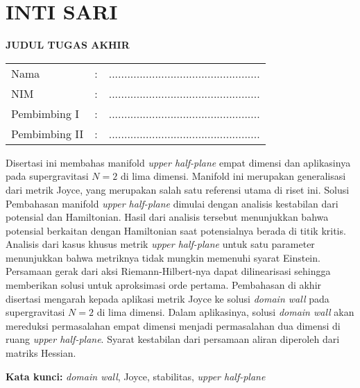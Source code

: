 \chapter*{INTI SARI}
\fontsize{14pt}{1.5em}\selectfont
\begin{center}
	\uppercase{\textbf{judul tugas akhir}}\\
\end{center}
\begin{tabular}{lcl}
	Nama & : & .................................................\\
	NIM & : & .................................................\\
	Pembimbing I &	: & .................................................\\
	Pembimbing II &	: & .................................................\\
\end{tabular}

\singlespacing
\noindent Disertasi ini membahas manifold \emph{upper half-plane} empat dimensi dan aplikasinya pada supergravitasi $N=2$ di lima dimensi. Manifold ini merupakan generalisasi dari metrik Joyce, yang merupakan salah satu referensi utama di riset ini. Solusi Pembahasan manifold \emph{upper half-plane} dimulai dengan analisis kestabilan dari potensial dan Hamiltonian. Hasil dari analisis tersebut menunjukkan bahwa potensial berkaitan dengan Hamiltonian saat potensialnya berada di titik kritis. Analisis dari kasus khusus metrik \emph{upper half-plane} untuk satu parameter menunjukkan bahwa metriknya tidak mungkin memenuhi syarat Einstein. Persamaan gerak dari aksi Riemann-Hilbert-nya dapat dilinearisasi sehingga memberikan solusi untuk aproksimasi orde pertama. Pembahasan di akhir disertasi mengarah kepada aplikasi metrik Joyce ke solusi \emph{domain wall} pada supergravitasi $N=2$ di lima dimensi. Dalam aplikasinya, solusi \emph{domain wall} akan mereduksi permasalahan empat dimensi menjadi permasalahan dua dimensi di ruang \emph{upper half-plane}. Syarat kestabilan dari persamaan aliran diperoleh dari matriks Hessian.

\noindent\textbf{Kata kunci:} \emph{domain wall}, Joyce, stabilitas, \emph{upper half-plane}